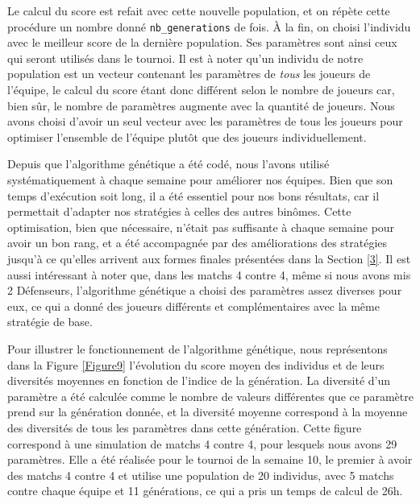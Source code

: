 \documentclass[a4paper,12pt]{article}
\begin{document}
Le calcul du score est refait avec cette nouvelle population, et on répète cette procédure un nombre donné \texttt{nb\_generations} de fois. À la fin, on choisi l'individu avec le meilleur score de la dernière population. Ses paramètres sont ainsi ceux qui seront utilisés dans le tournoi. Il est à noter qu'un individu de notre population est un vecteur contenant les paramètres de \emph{tous} les joueurs de l'équipe, le calcul du score étant donc différent selon le nombre de joueurs car, bien sûr, le nombre de paramètres augmente avec la quantité de joueurs. Nous avons choisi d'avoir un seul vecteur avec les paramètres de tous les joueurs pour optimiser l'ensemble de l'équipe plutôt que des joueurs individuellement.

Depuis que l'algorithme génétique a été codé, nous l'avons utilisé systématiquement à chaque semaine pour améliorer nos équipes. Bien que son temps d'exécution soit long, il a été essentiel pour nos bons résultats, car il permettait d'adapter nos stratégies à celles des autres binômes. Cette optimisation, bien que nécessaire, n'était pas suffisante à chaque semaine pour avoir un bon rang, et a été accompagnée par des améliorations des stratégies jusqu'à ce qu'elles arrivent aux formes finales présentées dans la Section \ref{3}. Il est aussi intéressant à noter que, dans les matchs 4 contre 4, même si nous avons mis 2 Défenseurs, l'algorithme génétique a choisi des paramètres assez diverses pour eux, ce qui a donné des joueurs différents et complémentaires avec la même stratégie de base.

Pour illustrer le fonctionnement de l'algorithme génétique, nous représentons dans la Figure \ref{Figure9} l'évolution du score moyen des individus et de leurs diversités moyennes en fonction de l'indice de la génération. La diversité d'un paramètre a été calculée comme le nombre de valeurs différentes que ce paramètre prend sur la génération donnée, et la diversité moyenne correspond à la moyenne des diversités de tous les paramètres dans cette génération. Cette figure correspond à une simulation de matchs 4 contre 4, pour lesquels nous avons 29 paramètres. Elle a été réalisée pour le tournoi de la semaine 10, le premier à avoir des matchs 4 contre 4 et utilise une population de 20 individus, avec 5 matchs contre chaque équipe et 11 générations, ce qui a pris un temps de calcul de 26h.
\end{document}
